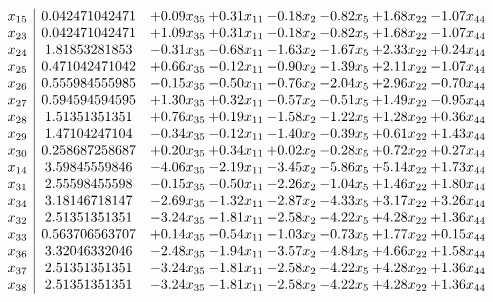 \documentclass[8pt]{article}
\begin{document}
\[\begin{array}{c| c c@{\hskip 2pt} c@{\hskip 2pt} c@{\hskip 2pt} c@{\hskip 2pt} c@{\hskip 2pt} c@{\hskip 2pt} }
 x_{15}   &  0.042471042471 & +  0.09 x_{35} & +  0.31 x_{11} & -0.18 x_{2} & -0.82 x_{5} & +  1.68 x_{22} & -1.07 x_{44}\\
 x_{23}   &  0.042471042471 & +  1.09 x_{35} & +  0.31 x_{11} & -0.18 x_{2} & -0.82 x_{5} & +  1.68 x_{22} & -1.07 x_{44}\\
 x_{24}   &  1.81853281853 & -0.31 x_{35} & -0.68 x_{11} & -1.63 x_{2} & -1.67 x_{5} & +  2.33 x_{22} & +  0.24 x_{44}\\
 x_{25}   &  0.471042471042 & +  0.66 x_{35} & -0.12 x_{11} & -0.90 x_{2} & -1.39 x_{5} & +  2.11 x_{22} & -1.07 x_{44}\\
 x_{26}   &  0.555984555985 & -0.15 x_{35} & -0.50 x_{11} & -0.76 x_{2} & -2.04 x_{5} & +  2.96 x_{22} & -0.70 x_{44}\\
 x_{27}   &  0.594594594595 & +  1.30 x_{35} & +  0.32 x_{11} & -0.57 x_{2} & -0.51 x_{5} & +  1.49 x_{22} & -0.95 x_{44}\\
 x_{28}   &  1.51351351351 & +  0.76 x_{35} & +  0.19 x_{11} & -1.58 x_{2} & -1.22 x_{5} & +  1.28 x_{22} & +  0.36 x_{44}\\
 x_{29}   &  1.47104247104 & -0.34 x_{35} & -0.12 x_{11} & -1.40 x_{2} & -0.39 x_{5} & +  0.61 x_{22} & +  1.43 x_{44}\\
 x_{30}   &  0.258687258687 & +  0.20 x_{35} & +  0.34 x_{11} & +  0.02 x_{2} & -0.28 x_{5} & +  0.72 x_{22} & +  0.27 x_{44}\\
 x_{14}   &  3.59845559846 & -4.06 x_{35} & -2.19 x_{11} & -3.45 x_{2} & -5.86 x_{5} & +  5.14 x_{22} & +  1.73 x_{44}\\
 x_{31}   &  2.55598455598 & -0.15 x_{35} & -0.50 x_{11} & -2.26 x_{2} & -1.04 x_{5} & +  1.46 x_{22} & +  1.80 x_{44}\\
 x_{34}   &  3.18146718147 & -2.69 x_{35} & -1.32 x_{11} & -2.87 x_{2} & -4.33 x_{5} & +  3.17 x_{22} & +  3.26 x_{44}\\
 x_{32}   &  2.51351351351 & -3.24 x_{35} & -1.81 x_{11} & -2.58 x_{2} & -4.22 x_{5} & +  4.28 x_{22} & +  1.36 x_{44}\\
 x_{33}   &  0.563706563707 & +  0.14 x_{35} & -0.54 x_{11} & -1.03 x_{2} & -0.73 x_{5} & +  1.77 x_{22} & +  0.15 x_{44}\\
 x_{36}   &  3.32046332046 & -2.48 x_{35} & -1.94 x_{11} & -3.57 x_{2} & -4.84 x_{5} & +  4.66 x_{22} & +  1.58 x_{44}\\
 x_{37}   &  2.51351351351 & -3.24 x_{35} & -1.81 x_{11} & -2.58 x_{2} & -4.22 x_{5} & +  4.28 x_{22} & +  1.36 x_{44}\\
 x_{38}   &  2.51351351351 & -3.24 x_{35} & -1.81 x_{11} & -2.58 x_{2} & -4.22 x_{5} & +  4.28 x_{22} & +  1.36 x_{44}\\

\end{array}\]
\end{document}
